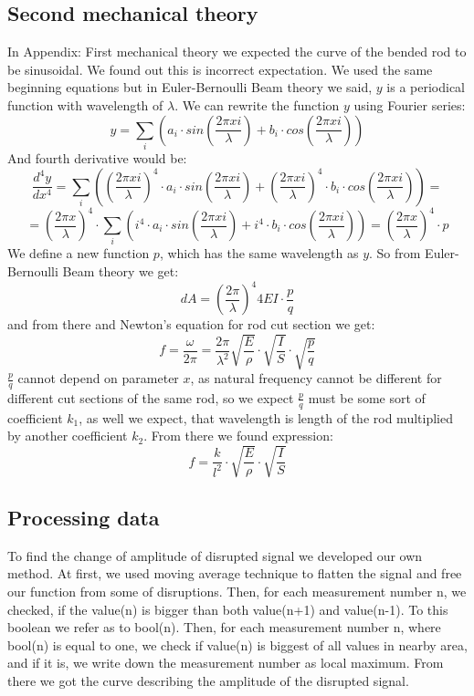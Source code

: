 \documentclass[10pt,a4paper]{article}
\begin{document}
\subsection{Second mechanical theory}
In Appendix: First mechanical theory we expected the curve of the bended rod to be sinusoidal. We found out this is incorrect expectation. We used the same beginning equations but in Euler-Bernoulli Beam theory we said, $y$ is a periodical function with wavelength of $\lambda$. We can rewrite the function $y$ using Fourier series:
$$ y = \sum_{i}(a_{i} \cdot sin(\frac{2\pi xi}{\lambda}) + b_{i} \cdot cos(\frac{2\pi xi}{\lambda})) $$
And fourth derivative would be:
$$ \frac{d^{4}y}{dx^{4}} = \sum_{i}((\frac{2\pi xi}{\lambda})^{4} \cdot a_{i} \cdot sin(\frac{2\pi xi}{\lambda}) + (\frac{2\pi xi}{\lambda})^{4} \cdot b_{i} \cdot cos(\frac{2\pi xi}{\lambda})) = $$
$$
= (\frac{2\pi x}{\lambda})^{4} \cdot \sum_{i}(i^{4} \cdot a_{i} \cdot sin(\frac{2\pi xi}{\lambda}) + i^{4} \cdot b_{i} \cdot cos(\frac{2\pi xi}{\lambda})) = (\frac{2\pi x}{\lambda})^{4} \cdot p$$
We define a new function $p$, which has the same wavelength as $y$. So from Euler-Bernoulli Beam theory we get:
$$dA=(\frac{2\pi}{\lambda})^{4}4EI\cdot \frac{p}{q}$$
and from there and Newton's equation for rod cut section we get:
$$f=\frac{\omega}{2\pi}= \frac{2 \pi}{\lambda^{2}} \sqrt{\frac{E}{\rho}} \cdot \sqrt{\frac{I}{S}} \cdot \sqrt{\frac{p}{q}}$$
$\frac{p}{q}$ cannot depend on parameter $x$, as natural frequency cannot be different for different cut sections of the same rod, so we expect $\frac{p}{q}$ must be some sort of coefficient $k_{1}$, as well we expect, that wavelength is length of the rod multiplied by another coefficient $k_{2}$. From there we found expression:
$$f = \frac{k}{l^{2}} \cdot \sqrt{\frac{E}{\rho}} \cdot \sqrt{\frac{I}{S}}$$
\subsection{Processing data}
To find the change of amplitude of disrupted signal we developed our own method. At first, we used moving average technique to flatten the signal and free our function from some of disruptions. Then, for each measurement number n, we checked, if the value(n) is bigger than both value(n+1) and value(n-1). To this boolean we refer as to bool(n). Then, for each measurement number n, where bool(n) is equal to one, we check if value(n) is biggest of all values in nearby area, and if it is, we write down the measurement number as local maximum. From there we got the curve describing the amplitude of the disrupted signal.
\end{document}

